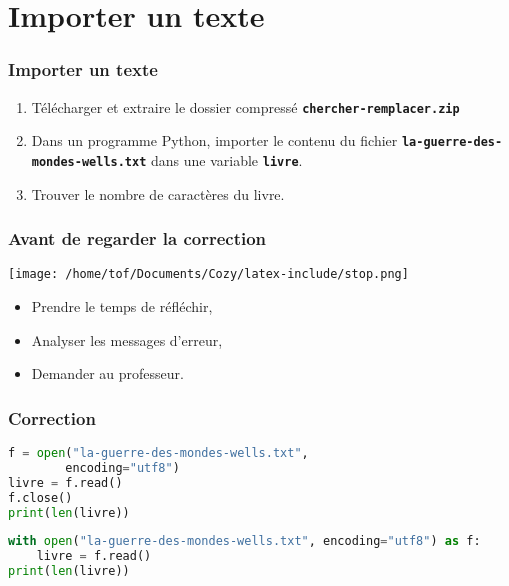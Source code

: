 \documentclass[svgnames,11pt]{beamer}
\begin{document}
\section{Importer un texte}
\begin{frame}
    \frametitle{Importer un texte}

    \begin{activite}
    \begin{enumerate}
        \item Télécharger et extraire le dossier compressé \texttt{\textbf{chercher-remplacer.zip}}
        \item Dans un programme Python, importer le contenu du fichier \texttt{\textbf{la-guerre-des-mondes-wells.txt}} dans une variable \textbf{\texttt{livre}}.
        \item Trouver le nombre de caractères du livre.
    \end{enumerate}
    \end{activite}

\end{frame}
\begin{frame}
    \frametitle{Avant de regarder la correction}
\begin{center}
    \centering
    \texttt{[image: /home/tof/Documents/Cozy/latex-include/stop.png]}
    \end{center}
{\Large
    \begin{itemize}
        \item Prendre le temps de réfléchir,
        \item Analyser les messages d'erreur,
        \item Demander au professeur.
    \end{itemize}
}
\end{frame}
\begin{frame}[fragile]
    \frametitle{Correction}
    \begin{center}
    \begin{lstlisting}[language=Python ,basicstyle=\ttfamily\small, xleftmargin=2em, xrightmargin=2em]
f = open("la-guerre-des-mondes-wells.txt", 
        encoding="utf8")
livre = f.read()
f.close()
print(len(livre))
\end{lstlisting}
    \label{importer}
    \end{center}

 \begin{center}
    \begin{lstlisting}[language=Python , basicstyle=\ttfamily\small, xleftmargin=2em, xrightmargin=2em]
with open("la-guerre-des-mondes-wells.txt", encoding="utf8") as f:
    livre = f.read()
print(len(livre))
\end{lstlisting}
    \label{importer2}
    \end{center}
\end{frame}
\end{document}
